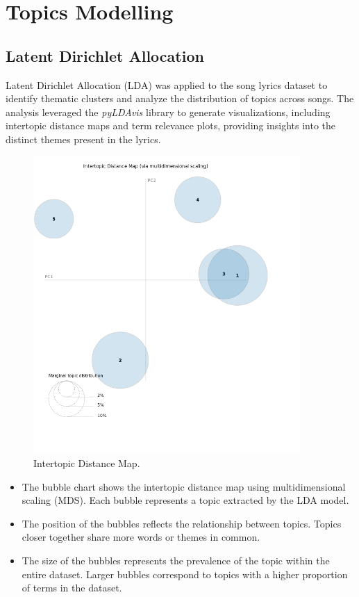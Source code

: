 

\section{Topics Modelling}
\label{sec:topicsmodelling}

\subsection{Latent Dirichlet Allocation}

Latent Dirichlet Allocation (LDA) was applied to the song lyrics dataset to
identify thematic clusters and analyze the distribution of topics across songs.
The analysis leveraged the \textit{pyLDAvis}\cite{pylda} library to generate
visualizations, including intertopic distance maps and term relevance plots,
providing insights into the distinct themes present in the lyrics.

\begin{center}
\begin{figure}[H]
  \centering
  \includegraphics[width=4in]{img/topics/png/topics.png}
  \caption{Intertopic Distance Map.}
  \label{Figure:intertopicdistancemap}
\end{figure}
\end{center}

\begin{itemize}
  \item The bubble chart shows the intertopic distance map using multidimensional
scaling (MDS). Each bubble represents a topic extracted by the LDA model.
  \item The position of the bubbles reflects the relationship between topics.
    Topics closer together share more words or themes in common.
  \item The size of the bubbles represents the prevalence of the topic within
    the entire dataset. Larger bubbles correspond to topics with a higher
    proportion of terms in the dataset.
\end{itemize}




